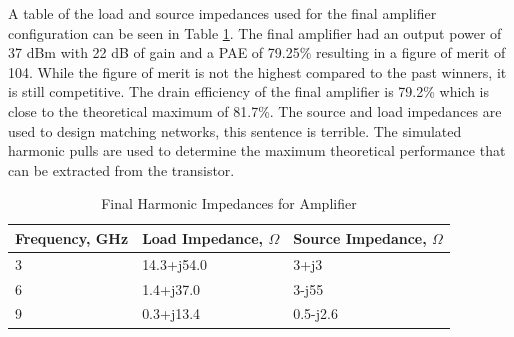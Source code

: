 A table of the load and source impedances used for the final amplifier configuration can be seen in Table \ref{table:harmonic_impedance}. The final amplifier had an output power of 37 dBm with 22 dB of gain and a PAE of 79.25\% resulting in a figure of merit of 104. While the figure of merit is not the highest compared to the past winners, it is still competitive. The drain efficiency of the final amplifier is 79.2\% which is close to the theoretical maximum of 81.7\%. The source and load impedances are used to design matching networks, this sentence is terrible. The simulated harmonic pulls are used to determine the maximum theoretical performance that can be extracted from the transistor.

\begin{table}
    \centering
    \caption{Final Harmonic Impedances for Amplifier}
    \label{table:harmonic_impedance}
    \begin{tabular}{|l|l|l|} \hline
    {Frequency, GHz} & {Load Impedance, $\Omega$} & {Source Impedance, $\Omega$} \\ \hline
    {3} & {14.3+j54.0} & {3+j3} \\ \hline
    {6} & {1.4+j37.0} & {3-j55} \\ \hline
    {9} & {0.3+j13.4} & {0.5-j2.6} \\ \hline
    \end{tabular}
\end{table}

